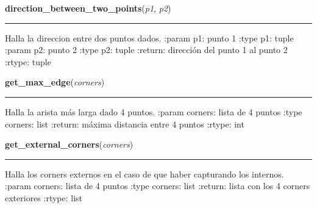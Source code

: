     \vspace{0.5ex}

\hspace{.8\funcindent}\begin{boxedminipage}{\funcwidth}

    \raggedright \textbf{direction\_between\_two\_points}(\textit{p1}, \textit{p2})

    \vspace{-1.5ex}

    \rule{\textwidth}{0.5\fboxrule}
\setlength{\parskip}{2ex}
    Halla la direccion entre dos puntos dados. :param p1: punto 1 :type p1:
    tuple :param p2: punto 2 :type p2: tuple :return: dirección del punto 1
    al punto 2 :rtype: tuple

\setlength{\parskip}{1ex}
    \end{boxedminipage}

    \label{src:functions:get_max_edge}

    \vspace{0.5ex}

\hspace{.8\funcindent}\begin{boxedminipage}{\funcwidth}

    \raggedright \textbf{get\_max\_edge}(\textit{corners})

    \vspace{-1.5ex}

    \rule{\textwidth}{0.5\fboxrule}
\setlength{\parskip}{2ex}
    Halla la arista más larga dado 4 puntos. :param corners: lista de 4 
    puntos :type corners: list :return: máxima distancia entre 4 puntos 
    :rtype: int

\setlength{\parskip}{1ex}
    \end{boxedminipage}

    \label{src:functions:get_external_corners}

    \vspace{0.5ex}

\hspace{.8\funcindent}\begin{boxedminipage}{\funcwidth}

    \raggedright \textbf{get\_external\_corners}(\textit{corners})

    \vspace{-1.5ex}

    \rule{\textwidth}{0.5\fboxrule}
\setlength{\parskip}{2ex}
    Halla los corners externos en el caso de que haber capturando los 
    internos. :param corners: lista de 4 puntos :type corners: list 
    :return: lista con los 4 corners exteriores :rtype: list

\setlength{\parskip}{1ex}
    \end{boxedminipage}


